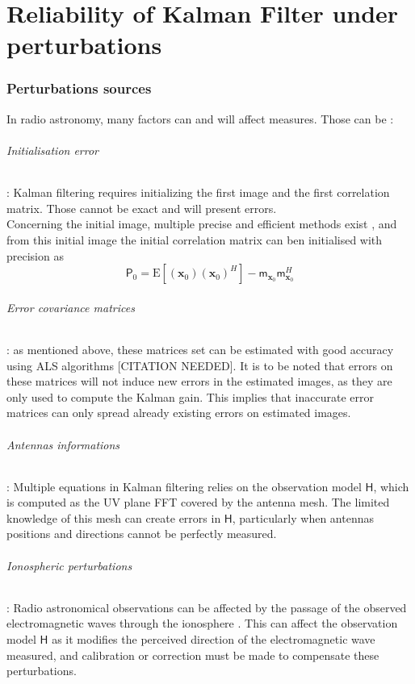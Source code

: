 \documentclass[titlepage]{article}
\newcommand{\moy}[1]{\boldsymbol{\mathsf{m}}_{#1}}
\newcommand{\autocorr}[1]{\expval{(#1)(#1)^H}}
\renewcommand{\expval}[1]{\text{E}\left[#1\right]}
\renewcommand{\H}{\boldsymbol{\mathsf{H}}}
\newcommand{\x}{\boldsymbol{x}}
\renewcommand{\P}{\boldsymbol{\mathsf{P}}}
\begin{document}
	\newpage
	\part{Reliability of Kalman Filter under perturbations}
	\section{Perturbations sources}
	
	In radio astronomy, many factors can and will affect measures. Those can be :
	\paragraph{Initialisation error} : Kalman filtering requires initializing the first image and the first correlation matrix. Those cannot be exact and will present errors. \\
	Concerning the initial image, multiple precise and efficient methods exist \cite{bible}, and from this initial image the initial correlation matrix can ben initialised\cite{intro_KF} with precision as 
	\begin{equation}\label{p0}
		\P_0 = \autocorr{\x_0} - \moy{\x_0}\moy{\x_0}^H
	\end{equation}
	
	\paragraph{Error covariance matrices} : as mentioned above, these matrices set can be estimated with good accuracy using ALS algorithms [CITATION NEEDED]. It is to be noted that errors on these matrices will not induce new errors in the estimated images, as they are only used to compute the Kalman gain. This implies that inaccurate error matrices can only spread already existing errors on estimated images.
	
	\paragraph{Antennas informations} : Multiple equations in Kalman filtering relies on the observation model $\H$, which is computed as the UV plane FFT covered by the antenna mesh. The limited knowledge of this mesh can create errors in $\H$, particularly when antennas positions and directions cannot be perfectly measured.
	
	\paragraph{Ionospheric perturbations} : Radio astronomical observations can be affected by the passage of the observed electromagnetic waves through the ionosphere \cite{iono}. This can affect the observation model $\H$ as it modifies the perceived direction of the electromagnetic wave measured, and calibration or correction must be made to compensate these perturbations.
	
\end{document}
